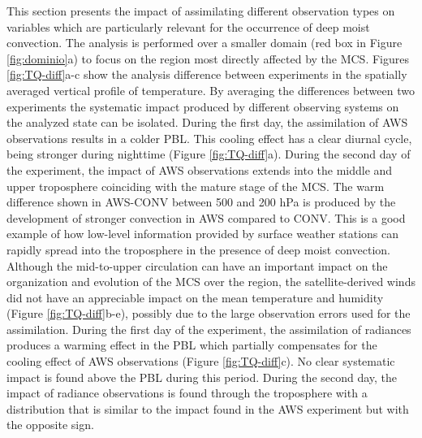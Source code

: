 \documentclass[final,5p,times,twocolumn,authoryear]{elsarticle} %
\begin{document}
This section presents the impact of assimilating different observation types on variables which are particularly relevant for the occurrence of deep moist convection. The analysis is performed over a smaller domain (red box in Figure \ref{fig:dominio}a) to focus on the region most directly affected by the MCS. Figures \ref{fig:TQ-diff}a-c show the analysis difference between experiments in the spatially averaged vertical profile of temperature. By averaging the differences between two experiments the systematic impact produced by different observing systems on the analyzed state can be isolated. During the first day, the assimilation of AWS observations results in a colder PBL. This cooling effect has a clear diurnal cycle, being stronger during nighttime (Figure \ref{fig:TQ-diff}a). During the second day of the experiment, the impact of AWS observations extends into the middle and upper troposphere coinciding with the mature stage of the MCS. The warm difference shown in AWS-CONV between 500 and 200 hPa is produced by the development of stronger convection in AWS compared to CONV. This is a good example of how low-level information provided by surface weather stations can rapidly spread into the troposphere in the presence of deep moist convection. Although the mid-to-upper circulation can have an important impact on the organization and evolution of the MCS over the region, the satellite-derived winds did not have an appreciable impact on the mean temperature and humidity (Figure \ref{fig:TQ-diff}b-e), possibly due to the large observation errors used for the assimilation.
During the first day of the experiment, the assimilation of radiances produces a warming effect in the PBL which partially compensates for the cooling effect of AWS observations (Figure \ref{fig:TQ-diff}c). No clear systematic impact is found above the PBL during this period. During the second day, the impact of radiance observations is found through the troposphere with a distribution that is similar to the impact found in the AWS experiment but with the opposite sign.
\end{document}
